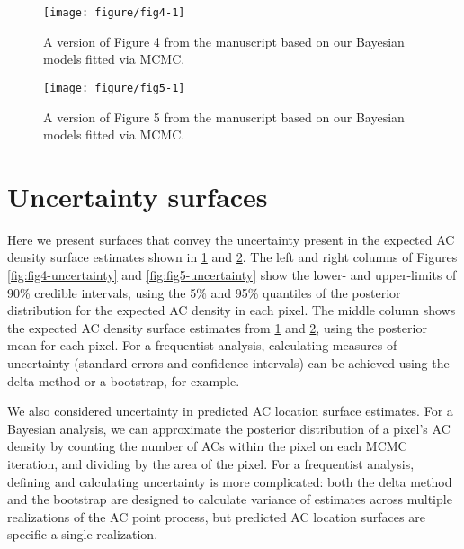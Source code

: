 \documentclass[10pt,a4paper]{article}\usepackage[]{graphicx}\usepackage[]{xcolor}
\makeatletter
\def\maxwidth{ %
  \ifdim\Gin@nat@width>\linewidth
    \linewidth
  \else
    \Gin@nat@width
  \fi
}
\newenvironment{knitrout}{}{} %
\makeatother
\begin{document}
\begin{knitrout}
\color{fgcolor}\begin{figure}
\texttt{[image: figure/fig4-1]} \caption[A version of Figure 4 from the manuscript based on our Bayesian models fitted via MCMC]{A version of Figure 4 from the manuscript based on our Bayesian models fitted via MCMC.}\label{fig:fig4}
\end{figure}

\end{knitrout}

\begin{knitrout}
\color{fgcolor}\begin{figure}
\texttt{[image: figure/fig5-1]} \caption[A version of Figure 5 from the manuscript based on our Bayesian models fitted via MCMC]{A version of Figure 5 from the manuscript based on our Bayesian models fitted via MCMC.}\label{fig:fig5}
\end{figure}

\end{knitrout}

\section{Uncertainty surfaces}
\label{sec:uncertainty}

Here we present surfaces that convey the uncertainty present in the
expected AC density surface estimates shown in \ref{fig:fig4} and
\ref{fig:fig5}. The left and right columns of Figures
\ref{fig:fig4-uncertainty} and \ref{fig:fig5-uncertainty} show the
lower- and upper-limits of 90\% credible intervals, using the 5\% and
95\% quantiles of the posterior distribution for the expected AC
density in each pixel. The middle column shows the expected AC density
surface estimates from \ref{fig:fig4} and \ref{fig:fig5}, using the
posterior mean for each pixel. For a frequentist analysis, calculating
measures of uncertainty (standard errors and confidence intervals) can
be achieved using the delta method or a bootstrap, for example.

We also considered uncertainty in predicted AC location surface
estimates. For a Bayesian analysis, we can approximate the posterior
distribution of a pixel's AC density by counting the number
of ACs within the pixel on each MCMC iteration, and dividing by the
area of the pixel. For a frequentist analysis, defining and
calculating uncertainty is more complicated: both the delta method and
the bootstrap are designed to calculate variance of estimates across
multiple realizations of the AC point process, but predicted AC location
surfaces are specific a single realization.
\end{document}
